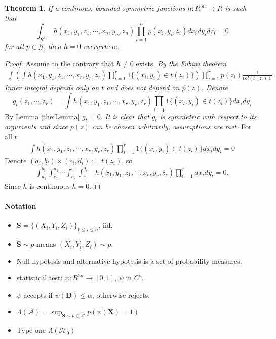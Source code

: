 \documentclass{article}
\newtheorem{Theorem}{Theorem}
\begin{document}
\begin{Theorem}
\label{th:1}
If a continous, bounded symmetric functions $h : R^{3n} \to R$ is such that 
\[
 \int_{R^{3n}} h(x_1,y_1,z_1,\cdots,x_n,y_n,z_n) \prod_{i=1}^n p(x_i,y_i,z_i) d x_i d y_i d z_i = 0
\]
for all $p \in \mathcal G$, then $h=0$ everywhere.
\end{Theorem}

\begin{proof}
Assume to the contrary that  $h \neq 0$ exists. 
\textit{ \color{ForestGreen}  By the Fubini theorem  }
\begin{align}
\int  \left( \int h(x_1,y_1,z_1,\cdots, x_r,y_r,z_r) \prod_{i=1}^r 1\{ (x_i,y_i) \in t(z_i) \}   \right) \prod_{i=1}^r  p(z_i) \frac{1}{vol(t(z_i))}
\end{align}
\textit{ \color{ForestGreen}  Inner integral depends only on $t$ and does not depend on $p(z)$. Denote }
\[
g_{t}( z_1,\cdots,z_r)  = \int h(x_1,y_1,z_1,\cdots, x_r,y_r,z_r) \prod_{i=1}^r 1\{ (x_i,y_i) \in t(z_i) \} dx_i dy_i 
\]
 By Lemma \ref{the:Lemma} $g_t=0$.  
 \textit{ \color{ForestGreen}  It is clear that  $g_{t}$ is symmetric with respect to its arguments and since $p(z)$ can be chosen arbitrarily, assumptions are met.}  For all  $t$
\begin{align}
\int h(x_1,y_1,z_1,\cdots, x_r,y_r,z_r) \prod_{i=1}^r 1\{ (x_i,y_i) \in t(z_i) \} dx_i dy_i  =  0
\end{align}
Denote $(a_i,b_i) \times (c_i,d_i):= t(z_i)$, so
\begin{align}
\int_{a_1}^{b_1} \int_{c_1}^{d_2} \cdots \int_{a_r}^{b_r} \int_{c_r}^{d_r}& h(x_1,y_1,z_1, \cdots, x_r,y_r,z_r) \prod_{i=1}^{r}  dx_i dy_i = 0.
\end{align}
Since $h$ is continuous $h=0$.
\end{proof}




\paragraph{Notation}
\begin{itemize}
 \item $\mathbf S = \{ (X_i,Y_i,Z_i) \}_{1 \leq i \leq n}$, iid.
 \item  $\mathbf S \sim p$ means $(X_i,Y_i,Z_i) \sim p$. 
 \item Null hypotesis and alternative hypotesis is a set of probability measures.
 \item statistical test: $\psi: R^{3n} \to [0,1]$, $\psi$ in $C^b$.
 \item $\psi$ accepts if $\psi(\mathbf D) \leq \alpha$, otherwise rejects.
 \item $\Lambda(\mathcal{A}) =  \sup_{\mathbf{S} \sim p \in \mathcal{A} }   p( \psi(\mathbf X) =1 )$
 \item Type one $\Lambda(\mathcal{H}_0)$
\end{itemize}
 
\end{document}
